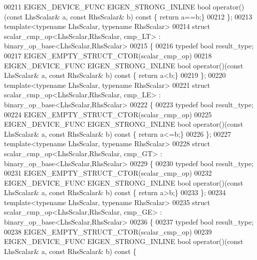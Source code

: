 \begin{DoxyCode}
00211   EIGEN\_DEVICE\_FUNC EIGEN\_STRONG\_INLINE \textcolor{keywordtype}{bool} operator()(\textcolor{keyword}{const} LhsScalar& a, \textcolor{keyword}{const} RhsScalar& b)\textcolor{keyword}{ const }\{\textcolor{keywordflow}{
      return} a==b;\}
00212 \};
00213 \textcolor{keyword}{template}<\textcolor{keyword}{typename} LhsScalar, \textcolor{keyword}{typename} RhsScalar>
00214 \textcolor{keyword}{struct }scalar\_cmp\_op<LhsScalar,RhsScalar, cmp\_LT> : binary\_op\_base<LhsScalar,RhsScalar>
00215 \{
00216   \textcolor{keyword}{typedef} \textcolor{keywordtype}{bool} result\_type;
00217   EIGEN\_EMPTY\_STRUCT\_CTOR(scalar\_cmp\_op)
00218   EIGEN\_DEVICE\_FUNC EIGEN\_STRONG\_INLINE \textcolor{keywordtype}{bool} operator()(\textcolor{keyword}{const} LhsScalar& a, \textcolor{keyword}{const} RhsScalar& b)\textcolor{keyword}{ const }\{\textcolor{keywordflow}{
      return} a<b;\}
00219 \};
00220 \textcolor{keyword}{template}<\textcolor{keyword}{typename} LhsScalar, \textcolor{keyword}{typename} RhsScalar>
00221 \textcolor{keyword}{struct }scalar\_cmp\_op<LhsScalar,RhsScalar, cmp\_LE> : binary\_op\_base<LhsScalar,RhsScalar>
00222 \{
00223   \textcolor{keyword}{typedef} \textcolor{keywordtype}{bool} result\_type;
00224   EIGEN\_EMPTY\_STRUCT\_CTOR(scalar\_cmp\_op)
00225   EIGEN\_DEVICE\_FUNC EIGEN\_STRONG\_INLINE \textcolor{keywordtype}{bool} operator()(\textcolor{keyword}{const} LhsScalar& a, \textcolor{keyword}{const} RhsScalar& b)\textcolor{keyword}{ const }\{\textcolor{keywordflow}{
      return} a<=b;\}
00226 \};
00227 \textcolor{keyword}{template}<\textcolor{keyword}{typename} LhsScalar, \textcolor{keyword}{typename} RhsScalar>
00228 \textcolor{keyword}{struct }scalar\_cmp\_op<LhsScalar,RhsScalar, cmp\_GT> : binary\_op\_base<LhsScalar,RhsScalar>
00229 \{
00230   \textcolor{keyword}{typedef} \textcolor{keywordtype}{bool} result\_type;
00231   EIGEN\_EMPTY\_STRUCT\_CTOR(scalar\_cmp\_op)
00232   EIGEN\_DEVICE\_FUNC EIGEN\_STRONG\_INLINE \textcolor{keywordtype}{bool} operator()(\textcolor{keyword}{const} LhsScalar& a, \textcolor{keyword}{const} RhsScalar& b)\textcolor{keyword}{ const }\{\textcolor{keywordflow}{
      return} a>b;\}
00233 \};
00234 \textcolor{keyword}{template}<\textcolor{keyword}{typename} LhsScalar, \textcolor{keyword}{typename} RhsScalar>
00235 \textcolor{keyword}{struct }scalar\_cmp\_op<LhsScalar,RhsScalar, cmp\_GE> : binary\_op\_base<LhsScalar,RhsScalar>
00236 \{
00237   \textcolor{keyword}{typedef} \textcolor{keywordtype}{bool} result\_type;
00238   EIGEN\_EMPTY\_STRUCT\_CTOR(scalar\_cmp\_op)
00239   EIGEN\_DEVICE\_FUNC EIGEN\_STRONG\_INLINE \textcolor{keywordtype}{bool} operator()(\textcolor{keyword}{const} LhsScalar& a, \textcolor{keyword}{const} RhsScalar& b)\textcolor{keyword}{ const }\{\textcolor{keywordflow}{
}
\end{DoxyCode}
